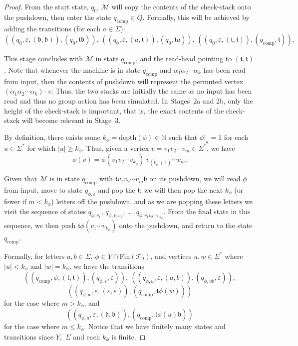 \begin{proof}
	From the start state, $q_0$, $\mathcal{M}$ will copy the contents of the check-stack onto the pushdown, then enter the state $q_\mathrm{comp} \in Q$.
	Formally, this will be achieved by adding the transitions (for each $a \in \Sigma$):
	\[
	(
	(q_0,\varepsilon,(\mathfrak{b},\mathfrak{b})),
	(q_0,\mathfrak{t}\mathfrak{b})
	),\,
	(
	(q_0,\varepsilon,(a,\mathfrak{t})),
	(q_0,\mathfrak{t}a)
	),\,
	(
	(q_0,\varepsilon,(\mathfrak{t},\mathfrak{t})),
	(q_\mathrm{comp},\mathfrak{t})
	).
	\]
	
	This stage concludes with $\mathcal{M}$ in state $q_{\mathrm{comp}}$, and the read-head pointing to $(\mathfrak t, \mathfrak t)$. 
	Note that whenever the machine is in state $q_{\mathrm{comp}}$ and $\alpha_1 \alpha_2 \cdots \alpha_k$ has been read from input, then the contents of pushdown will represent the permuted vertex $(\alpha_1 \alpha_2 \cdots \alpha_k) \cdot v$.
	Thus, the two stacks are initially the same as no input has been read and thus no group action has been simulated.
	In Stages~2a and 2b, only the height of the check-stack is important, that is, the exact contents of the check-stack will become relevant in Stage~3.
	
	
	By definition, there exists some $k_\phi = \mathrm{depth}(\phi) \in \mathbb{N}$ such that $\left.\phi\right\vert_u = 1$ for each $u \in \Sigma^*$ for which $\vert u \vert \geq k_\phi$.
	Thus, given a vertex $v = v_1 v_2 \cdots v_m \in \Sigma^*$, we have
	\[
	\phi(v)
	=
	\phi(v_1 v_2 \cdots v_{k_\phi})
	\ 
	v_{(k_\phi+1)}
	\cdots
	v_m.
	\]
	
	Given that $\mathcal{M}$ is in state $q_\mathrm{comp}$ with $\mathfrak{t} v_1 v_2 \cdots v_m \mathfrak{b}$ on its pushdown, we will read $\phi$ from input, move to state $q_{\phi,\varepsilon}$ and pop the $\mathfrak{t}$;
	we will then pop the next $k_\phi$ (or fewer if $m < k_\phi$) letters off the pushdown, and as we are popping these letters we visit the sequence of states $q_{\phi,v_1}$, $q_{\phi,v_1 v_2}$, \dots, $q_{\phi,v_1 v_2 \cdots v_{k_\phi}}$.
	From the final state in this sequence, we then push $\mathfrak t\phi(v_1\cdots v_{k_\phi})$ onto the pushdown, and return to the state $q_{\mathrm{comp}}$.
	
	Formally, for letters $a,b \in \Sigma$, $\phi \in Y\cap\mathrm{Fin}(\mathcal{T}_d)$, and vertices $u,w\in\Sigma^*$ where $ |u|< k_\phi$ and $ |w|=k_\phi$, we have the transitions
	\[
	(
	(q_{\mathrm{comp}}, \phi, (\mathfrak{t},\mathfrak{t})),
	(q_{\phi,\varepsilon}, \varepsilon)
	), \ 
	(
	(q_{\phi,u}, \varepsilon, (a,b)),
	(q_{\phi, ub}, \varepsilon)
	),
	\]
	\[
	(
	(q_{\phi,  w}, \varepsilon, (\varepsilon,\varepsilon)),
	(q_\mathrm{comp}, \mathfrak{t}\phi(w))
	)
	\]
	for the case where $m > k_\phi$, and
	\[
	(
	(q_{\phi, u}, \varepsilon, (\mathfrak{b},\mathfrak{b})),
	(q_\mathrm{comp}, \mathfrak{t}\phi(u)\mathfrak{b})
	)
	\]
	for the case where $m \leq k_\phi$.
	Notice that we have finitely many states and transitions  since $Y,$ $\Sigma$ and each $k_\phi$ is finite.
	

\end{proof}
